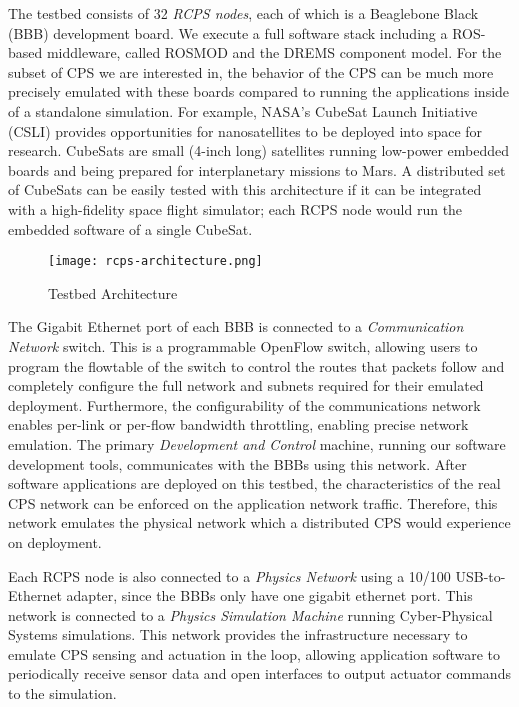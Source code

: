 The testbed consists of 32 \emph{RCPS nodes}, each of which is a Beaglebone Black (BBB) \cite{BBB} development board. We execute a full software stack including a ROS-based middleware, called ROSMOD \cite{kumarROSMOD} and the DREMS component model. For the subset of CPS we are interested in, the behavior of the CPS can be much more precisely emulated with these boards compared to running the applications inside of a standalone simulation. For example, NASA's CubeSat Launch Initiative (CSLI) \cite{CubeSat} provides opportunities for nanosatellites to be deployed into space for research. CubeSats are small (4-inch long) satellites running low-power embedded boards and being prepared for interplanetary missions \cite{CubeSat_Mars} to Mars. A distributed set of CubeSats can be easily tested with this architecture if it can be integrated with a high-fidelity space flight simulator; each RCPS node would run the embedded software of a single CubeSat.  

\begin{figure}[h]
    \centering
    \texttt{[image: rcps-architecture.png]}
    \caption{Testbed Architecture}
    \label{fig:architecture}
\end{figure}

The Gigabit Ethernet port of each BBB is connected to a \emph{Communication Network} switch. This is a programmable OpenFlow \cite{openflow} switch, allowing users to program the flowtable of the switch to control the routes that packets follow and completely configure the full network and subnets required for their emulated deployment.  Furthermore, the configurability of the communications network enables per-link or per-flow bandwidth throttling, enabling precise network emulation.  The primary \emph{Development and Control} machine, running our software development tools, communicates with the BBBs using this network. After software applications are deployed on this testbed, the characteristics of the real CPS network can be enforced on the application network traffic. Therefore, this network emulates the physical network which a distributed CPS would experience on deployment.

Each RCPS node is also connected to a \emph{Physics Network} using a 10/100 USB-to-Ethernet adapter, since the BBBs only have one gigabit ethernet port. This network is connected to a \emph{Physics Simulation Machine} running Cyber-Physical Systems simulations. This network provides the infrastructure necessary to emulate CPS sensing and actuation in the loop, allowing application software to periodically receive sensor data and open interfaces to output actuator commands to the simulation.

